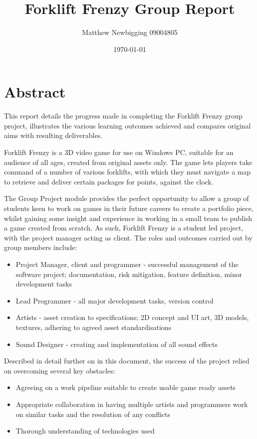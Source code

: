 \documentclass[12pt]{article}
\title{Forklift Frenzy Group Report}
\author{Matthew Newbigging 09004805}
\date{\today}
\begin{document}
\maketitle
\newpage

\section{Abstract}
	This report details the progress made in completing the Forklift Frenzy group project, illustrates the various learning outcomes achieved and compares original aims with resulting deliverables.
		
	Forklift Frenzy is a 3D video game for use on Windows PC, suitable for an audience of all ages, created from original assets only. The game lets players take command of a number of various forklifts, with which they must navigate a map to retrieve and deliver certain packages for points, against the clock.
	
	The Group Project module provides the perfect opportunity to allow a group of students keen to work on games in their future careers to create a portfolio piece, whilst gaining some insight and experience in working in a small team to publish a game created from scratch. As such, Forklift Frenzy is a student led project, with the project manager acting as client. The roles and outcomes carried out by group members include:
	\begin{itemize}
		\item Project Manager, client and programmer - successful management of the software project; documentation, risk mitigation, feature definition, minor development tasks
		\item Lead Programmer - all major development tasks, version control
		\item Artists - asset creation to specifications; 2D concept and UI
		art, 3D models, textures, adhering to agreed asset standardisations
		\item Sound Designer - creating and implementation of all sound effects
	\end{itemize}
	
	Described in detail further on in this document, the success of the project relied on overcoming several key obstacles:
	\begin{itemize}
		\item Agreeing on a work pipeline suitable to create usable game ready assets
		\item Appropriate collaboration in having multiple artists and programmers work on similar tasks and the resolution of any conflicts 
		\item Thorough understanding of technologies used
	\end{itemize}
	
\end{document}
